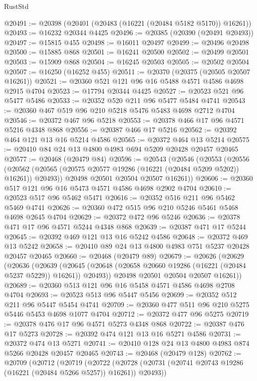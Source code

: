 \begin{lexlean}{RustStd}
\begin{coremodule}
@20491 := @20398 (@20401 (@20483 (@16221 (@20484 @5182 @5170)) @16261))
@20493 := @16232 @20344 @4425
@20496 := @20385 (@20390 (@20491 @20493))
@20497 := @15815 @455
@20498 := @16011 @20497
@20499 := @20496 @20498
@20500 := @15885 @868
@20501 := @16241 @20500
@20502 := @20499 @20501
@20503 := @15909 @868
@20504 := @16245 @20503
@20505 := @20502 @20504
@20507 := @16250 (@16252 @455)
@20511 := @20370 (@20375 (@20505 @20507 @16261))
@20521 := @20360 @521 @121 @96 @16 @5488 @4571 @4586 @4698 @2915 @4704
@20523 := @17794 @20344 @4425
@20527 := @20523 @521 @96 @5477 @5486
@20533 := @20352 @520 @211 @96 @5477 @5484 @4741
@20543 := @20360 @467 @519 @96 @210 @5218 @5476 @5483 @4698 @2712 @4704
@20546 := @20372 @467 @96 @5218
@20553 := @20378 @466 @17 @96 @4571 @5216 @4348 @868
@20556 := @20387 @466 @17 @5216
@20562 := @20392 @464 @121 @13 @16 @5214 @4586
@20565 := @20372 @464 @13 @5214
@20575 := @20410 @84 @24 @13 @4800 @4983 @694 @5209 @20428 @20457 @20465
@20577 := @20468 (@20479 @84)
@20596 := @20543
    (@20546
      (@20553
        (@20556
          (@20562 (@20565 (@20575 @20577 @19286 (@16221 (@20484 @5209 @5202)) @16261)) @20493))
        @20498
        @20501
        @20504
        @20507
        @16261))
@20606 := @20360 @517 @121 @96 @16 @5473 @4571 @4586 @4698 @2902 @4704
@20610 := @20523 @517 @96 @5462 @5471
@20616 := @20352 @516 @211 @96 @5462 @5469 @4741
@20626 := @20360 @472 @515 @96 @210 @5246 @5461 @5468 @4698 @2645 @4704
@20629 := @20372 @472 @96 @5246
@20636 := @20378 @471 @17 @96 @4571 @5244 @4348 @868
@20639 := @20387 @471 @17 @5244
@20645 := @20392 @469 @121 @13 @16 @5242 @4586
@20648 := @20372 @469 @13 @5242
@20658 := @20410 @89 @24 @13 @4800 @4983 @751 @5237 @20428 @20457 @20465
@20660 := @20468 (@20479 @89)
@20679 := @20626
    (@20629
      (@20636
        (@20639
          (@20645 (@20648 (@20658 @20660 @19286 (@16221 (@20484 @5237 @5229)) @16261)) @20493))
        @20498
        @20501
        @20504
        @20507
        @16261))
@20689 := @20360 @513 @121 @96 @16 @5458 @4571 @4586 @4698 @2708 @4704
@20693 := @20523 @513 @96 @5447 @5456
@20699 := @20352 @512 @211 @96 @5447 @5454 @4741
@20709 := @20360 @477 @511 @96 @210 @5275 @5446 @5453 @4698 @1077 @4704
@20712 := @20372 @477 @96 @5275
@20719 := @20378 @476 @17 @96 @4571 @5273 @4348 @868
@20722 := @20387 @476 @17 @5273
@20728 := @20392 @474 @121 @13 @16 @5271 @4586
@20731 := @20372 @474 @13 @5271
@20741 := @20410 @128 @24 @13 @4800 @4983 @874 @5266 @20428 @20457 @20465
@20743 := @20468 (@20479 @128)
@20762 := @20709
    (@20712
      (@20719
        (@20722
          (@20728 (@20731 (@20741 @20743 @19286 (@16221 (@20484 @5266 @5257)) @16261)) @20493))

\end{coremodule}
\end{lexlean}
